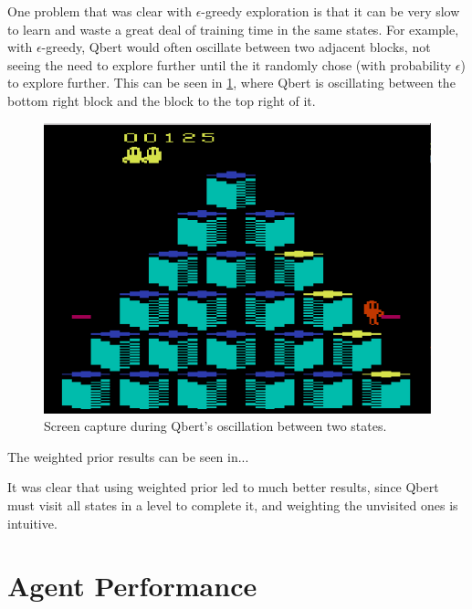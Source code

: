 \documentclass[a4paper,titlepage]{article}
\begin{document}
	One problem that was clear with $\epsilon$-greedy exploration is that it can be very slow to learn and waste a great deal of training time in the same states. For example, with $\epsilon$-greedy, Qbert would often oscillate between two adjacent blocks, not seeing the need to explore further until the it randomly chose (with probability $\epsilon$) to explore further. This can be seen in \cref{fig:random_oscillations}, where Qbert is oscillating between the bottom right block and the block to the top right of it.
	
	\begin{figure}[!htb]
		\centering
		\includegraphics[width=\columnwidth]{screenshots/random_oscillations_2.png}
		\caption
		{Screen capture during Qbert's oscillation between two states.}
		\label{fig:random_oscillations}
	\end{figure}

	The weighted prior results can be seen in...
	
	
	It was clear that using weighted prior led to much better results, since Qbert must visit all states in a level to complete it, and weighting the unvisited ones is intuitive.
	
	
	\section{Agent Performance} \label{sec:performance}
	
\end{document}
